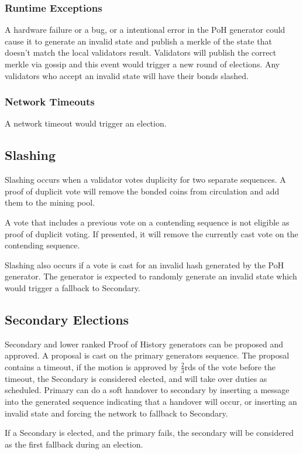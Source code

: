 \documentclass[12pt]{article}
\begin{document}
\subsubsection{Runtime Exceptions}
A hardware failure or a bug, or a intentional error in the PoH generator could cause it to generate an invalid state and publish a merkle of the state that doesn’t match the local validators result.  Validators will publish the correct merkle via gossip and this event would trigger a new round of elections.  Any validators who accept an invalid state will have their bonds slashed.

\subsubsection{Network Timeouts}

A network timeout would trigger an election.

\subsection{Slashing}
Slashing occurs when a validator votes duplicity for two separate sequences.  A proof of duplicit vote will remove the bonded coins from circulation and add them to the mining pool.

A vote that includes a previous vote on a contending sequence is not eligible as proof of duplicit voting.  If presented, it will remove the currently cast vote on the contending sequence.

Slashing also occurs if a vote is cast for an invalid hash generated by the PoH generator.  The generator is expected to randomly generate an invalid state which would trigger a fallback to Secondary.
\subsection{Secondary Elections}
Secondary and lower ranked Proof of History generators can be proposed and approved.  A proposal is cast on the primary generators sequence.  The proposal contains a timeout, if the motion is approved by \(\frac{2}{3}\)rds of the vote before the timeout, the Secondary is considered elected, and will take over duties as scheduled.  Primary can do a soft handover to secondary by inserting a message into the generated sequence indicating that a handover will occur, or inserting an invalid state and forcing the network to fallback to Secondary.

If a Secondary is elected, and the primary fails, the secondary will be considered as the first fallback during an election.
\end{document}
